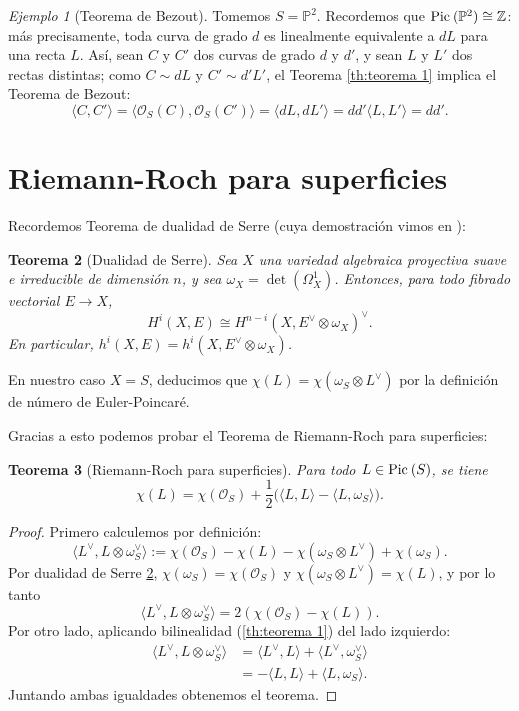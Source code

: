 \documentclass[spanish,12pt]{amsart}
\newcommand{\Pic}[1]{\textup{Pic}{ \: (#1)}}
\newtheorem{theorem}{Teorema}[section]
\theoremstyle{definition}
\theoremstyle{remark}
\newtheorem{example}[theorem]{Ejemplo}
\numberwithin{equation}{section}
\newcommand{\integers}{\mathbb{Z}}
\renewcommand{\O}{\mathcal{O}}
\begin{document}
\begin{example}[Teorema de Bezout]
Tomemos $S = \mathbb{P}^2$. Recordemos que $\Pic {\mathbb{P}^2} \cong \integers$: más precisamente, toda curva de grado $d$ es linealmente equivalente a $d L$ para una recta $L$. Así, sean $C$ y $C'$ dos curvas de grado $d$ y $d'$, y sean $L$ y $L'$ dos rectas distintas; como $C \sim d L$ y $C' \sim d' L'$, el Teorema \ref{th:teorema 1} implica el Teorema de Bezout:
\[
    \langle C, C' \rangle  = \langle \O_S (C), \O_S (C')\rangle  = \langle d L, d L' \rangle = d d' \langle L, L'\rangle  = d d'.
\]
\end{example}



\section{Riemann-Roch para superficies}

Recordemos Teorema de dualidad de Serre (cuya demostración vimos en \cite[Teorema 5.1.3]{notas_pedro}):

\begin{theorem}[Dualidad de Serre]\label{th:dualidad de serre}
Sea $X$ una variedad algebraica proyectiva suave e irreducible de dimensión $n$, y sea $\omega_X = \det (\Omega_X^1)$. Entonces, para todo fibrado vectorial $E \to X$,
\[
    H^i (X, E) \cong H^{n-i} (X, E^\vee \otimes \omega_X)^{\vee}.
\]
En particular, $h^i (X, E) = h^i (X, E^\vee \otimes \omega_X)$.
\end{theorem}
En nuestro caso $X = S$, deducimos que $\chi (L) = \chi (\omega_S \otimes L^\vee)$ por la definición de número de Euler-Poincaré.

Gracias a esto podemos probar el Teorema de Riemann-Roch para superficies:

\begin{theorem}[Riemann-Roch para superficies]\label{th:riemann-roch para superficies}
Para todo $L \in \Pic S$, se tiene
\[
    \chi (L) = \chi (\O_S) + \frac 1 2 \big ( \langle L, L\rangle  - \langle L, \omega_S\rangle  \big ).
\]
\end{theorem}
\begin{proof}
Primero calculemos por definición:
\[
    \langle L^\vee, L \otimes \omega_S^\vee \rangle  := \chi (\O_S) - \chi (L) - \chi (\omega_S \otimes L^\vee) + \chi (\omega_S).
\]
Por dualidad de Serre \ref{th:dualidad de serre}, $\chi (\omega_S) = \chi (\O_S)$ y $\chi (\omega_S \otimes L ^\vee) = \chi (L)$, y por lo tanto
\[
    \langle L^\vee, L \otimes \omega_S^\vee \rangle = 2 \left ( \chi (\O_S) - \chi (L) \right).
\]
Por otro lado, aplicando bilinealidad (\ref{th:teorema 1}) del lado izquierdo:
\begin{align*}
\langle L^\vee, L \otimes \omega_S^\vee \rangle  &= \langle L^\vee, L\rangle + \langle L^\vee, \omega_S^\vee \rangle \\
&= - \langle L , L\rangle  + \langle L, \omega_S\rangle.
\end{align*}
Juntando ambas igualdades obtenemos el teorema.
\end{proof}
\end{document}
